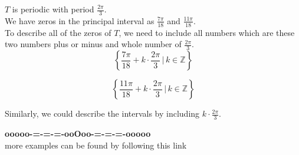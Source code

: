 \documentclass{ximera}
\begin{document}
$T$ is periodic with period $\frac{2\pi}{3}$. \\



We have zeros in the principal interval as $\frac{7\pi}{18}$ and $\frac{11\pi}{18}$. \\


To describe all of the zeros of $T$, we need to include all numbers which are these two numbers plus or minus and whole number of $\frac{2\pi}{3}$. \\



\[
\left\{  \frac{7\pi}{18} + k  \cdot \frac{2\pi}{3}  \, | \,  k \in \mathbb{Z}         \right\}
\]



\[
\left\{  \frac{11\pi}{18} + k  \cdot \frac{2\pi}{3}  \, | \,  k \in \mathbb{Z}         \right\}
\]




Similarly, we could describe the intervals by including $k  \cdot \frac{2\pi}{3} $. \\














\begin{center}
\textbf{\textcolor{green!50!black}{ooooo-=-=-=-ooOoo-=-=-=-ooooo}} \\

more examples can be found by following this link\\ 

\end{center}
\end{document}
